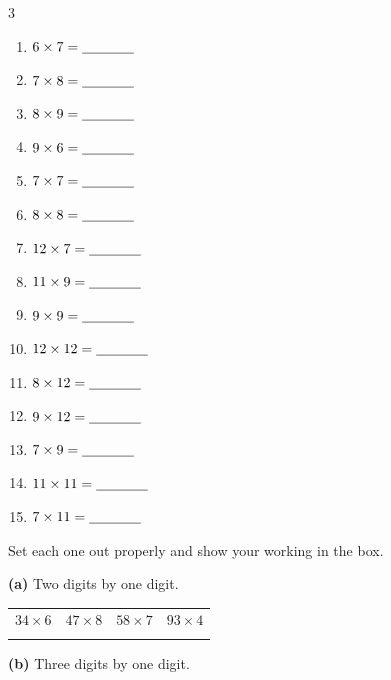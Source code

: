 \documentclass[12pt,a4paper]{article}
\begin{document}
\vspace{10pt}
\begin{multicols}{3}
\begin{enumerate}[label=(\alph*), itemsep=9pt]
  \item $6 \times 7 = \blank[1.3cm]$
  \item $7 \times 8 = \blank[1.3cm]$
  \item $8 \times 9 = \blank[1.3cm]$
  \item $9 \times 6 = \blank[1.3cm]$
  \item $7 \times 7 = \blank[1.3cm]$
  \item $8 \times 8 = \blank[1.3cm]$
  \item $12 \times 7 = \blank[1.3cm]$
  \item $11 \times 9 = \blank[1.3cm]$
  \item $9 \times 9 = \blank[1.3cm]$
  \item $12 \times 12 = \blank[1.3cm]$
  \item $8 \times 12 = \blank[1.3cm]$
  \item $9 \times 12 = \blank[1.3cm]$
  \item $7 \times 9 = \blank[1.3cm]$
  \item $11 \times 11 = \blank[1.3cm]$
  \item $7 \times 11 = \blank[1.3cm]$
\end{enumerate}
\end{multicols}


\noindent Set each one out properly and show your working in the box.

\vspace{6pt}
\noindent\textbf{(a)} Two digits by one digit.

\vspace{4pt}
\noindent
\begin{tabularx}{\textwidth}{|X|X|X|X|}
  \hline
  $34 \times 6$ & $47 \times 8$ & $58 \times 7$ & $93 \times 4$ \\
  \rule[-2.5em]{0pt}{3.1em} & & & \\
  \hline
\end{tabularx}

\vspace{12pt}
\noindent\textbf{(b)} Three digits by one digit.
\end{document}
